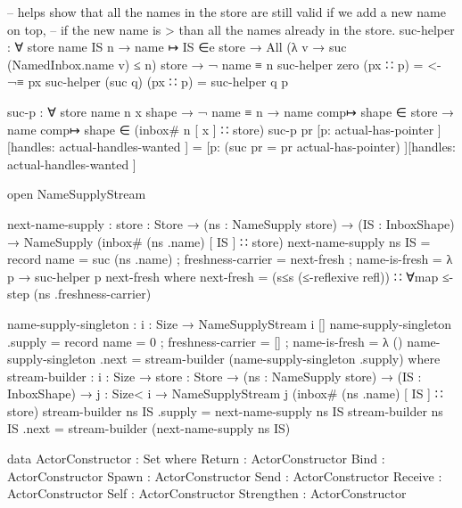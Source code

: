 \begin{code}
-- helps show that all the names in the store are still valid if we add a new name on top,
-- if the new name is > than all the names already in the store.
suc-helper : ∀ {store name IS n} →
             name ↦ IS ∈e store →
             All (λ v → suc (NamedInbox.name v) ≤ n) store →
             ¬ name ≡ n
suc-helper zero (px ∷ p) = <-¬≡ px
suc-helper (suc q) (px ∷ p) = suc-helper q p

suc-p : ∀ {store name n x shape} → ¬ name ≡ n → name comp↦ shape ∈ store → name comp↦ shape ∈ (inbox# n [ x ] ∷ store)
suc-p pr [p: actual-has-pointer ][handles: actual-handles-wanted ] = [p: (suc {pr = pr} actual-has-pointer) ][handles: actual-handles-wanted ]

open NameSupplyStream

next-name-supply : {store : Store} → (ns : NameSupply store) → (IS : InboxShape) → NameSupply (inbox# (ns .name) [ IS ] ∷ store)
next-name-supply ns IS = record {
  name = suc (ns .name)
  ; freshness-carrier = next-fresh
  ; name-is-fresh = λ p → suc-helper p next-fresh
  }
  where
    next-fresh = (s≤s (≤-reflexive refl)) ∷ ∀map ≤-step (ns .freshness-carrier)

name-supply-singleton : {i : Size} → NameSupplyStream i []
name-supply-singleton .supply = record {
  name = 0
  ; freshness-carrier = []
  ; name-is-fresh = λ { () }
  }
name-supply-singleton .next = stream-builder (name-supply-singleton .supply)
  where
    stream-builder : {i : Size} → {store : Store} → (ns : NameSupply store) → (IS : InboxShape) → {j : Size< i} → NameSupplyStream j (inbox# (ns .name) [ IS ] ∷ store)
    stream-builder ns IS .supply = next-name-supply ns IS
    stream-builder ns IS .next = stream-builder (next-name-supply ns IS)

data ActorConstructor : Set where
  Return : ActorConstructor
  Bind : ActorConstructor
  Spawn : ActorConstructor
  Send : ActorConstructor
  Receive : ActorConstructor
  Self : ActorConstructor
  Strengthen : ActorConstructor


\end{code}

